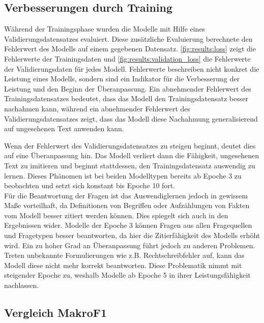 \subsection{Verbesserungen durch Training}
Während der Trainingsphase wurden die Modelle mit Hilfe eines Validierungsdatensatzes evaluiert.
Diese zusätzliche Evaluierung berechnete den Fehlerwert des Modells auf einem gegebenen Datensatz.
\cref{fig:results:loss} zeigt die Fehlerwerte der Trainingsdaten und \cref{fig:results:validation_loss} die Fehlerwerte der Validierungsdaten für jedes Modell.
Fehlerwerte beschreiben nicht konkret die Leistung eines Modells, sondern sind ein Indikator für die Verbesserung der Leistung und den Beginn der Überanpassung.
Ein abnehmender Fehlerwert des Trainingsdatensatzes bedeutet, dass das Modell den Trainingsdatensatz besser nachahmen kann, während ein abnehmender Fehlerwert des Validierungsdatensatzes zeigt, dass das Modell diese Nachahmung generalisierend auf ungesehenen Text anwenden kann.

Wenn der Fehlerwert des Validierungsdatensatzes zu steigen beginnt, deutet dies auf eine Überanpassung hin.
Das Modell verliert dann die Fähigkeit, ungesehenen Text zu imitieren und beginnt stattdessen, den Trainingsdatensatz auswendig zu lernen.
Dieses Phänomen ist bei beiden Modelltypen bereits ab Epoche 3 zu beobachten und setzt sich konstant bis Epoche 10 fort.\\

Für die Beantwortung der Fragen ist das Auswendiglernen jedoch in gewissem Maße vorteilhaft, da Definitionen von Begriffen oder Aufzählungen von Fakten vom Modell besser zitiert werden können.
Dies spiegelt sich auch in den Ergebnissen wider.
Modelle der Epoche 3 können Fragen aus allen Fragequellen und Fragetypen besser beantworten, da hier die Zitierfähigkeit des Modells erhöht wird.
Ein zu hoher Grad an Überanpassung führt jedoch zu anderen Problemen.
Treten unbekannte Formulierungen wie z.B. Rechtschreibfehler auf, kann das Modell diese nicht mehr korrekt beantworten.
Diese Problematik nimmt mit steigender Epoche zu, weshalb Modelle ab Epoche 5 in ihrer Leistungsfähigkeit nachlassen.\\

\subsection{Vergleich MakroF1}

